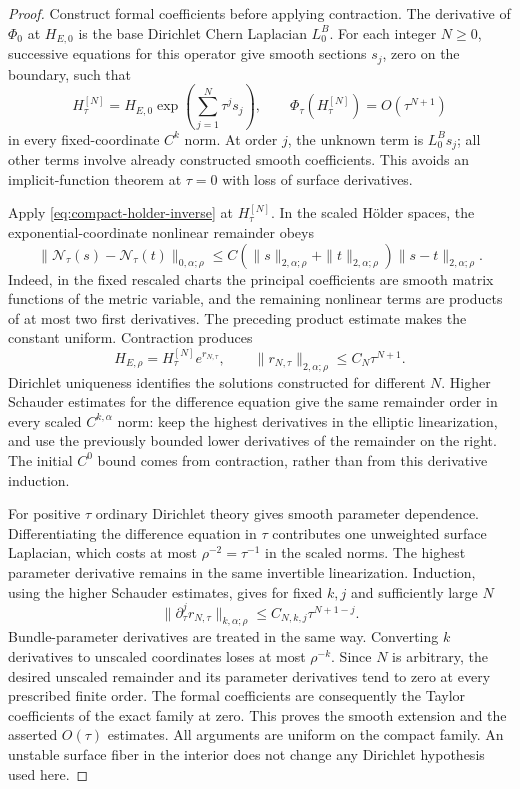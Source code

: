 \documentclass[11pt]{amsart}
\theoremstyle{definition}
\theoremstyle{remark}
\theoremstyle{plain}
\begin{document}
\begin{proof}
Construct formal coefficients before applying contraction. The derivative
of $\Phi_0$ at $H_{E,0}$ is the base Dirichlet Chern Laplacian $L_0^B$.
For each integer $N\geq0$, successive equations for this operator give
smooth sections $s_j$, zero on the boundary, such that
\[
 H_\tau^{[N]}=H_{E,0}\exp\left(\sum_{j=1}^N\tau^j s_j\right),
 \qquad
 \Phi_\tau(H_\tau^{[N]})=O(\tau^{N+1})
\]
in every fixed-coordinate $C^k$ norm. At order $j$, the unknown term is
$L_0^Bs_j$; all other terms involve already constructed smooth
coefficients. This avoids an implicit-function theorem at $\tau=0$
with loss of surface derivatives.

Apply \eqref{eq:compact-holder-inverse} at $H_\tau^{[N]}$. In the scaled
H\"older spaces, the exponential-coordinate nonlinear remainder obeys
\[
 \|\mathcal N_\tau(s)-\mathcal N_\tau(t)\|_{0,\alpha;\rho}
 \leq C(\|s\|_{2,\alpha;\rho}+\|t\|_{2,\alpha;\rho})
              \|s-t\|_{2,\alpha;\rho}.
\]
Indeed, in the fixed rescaled charts the principal coefficients are smooth
matrix functions of the metric variable, and the remaining nonlinear
terms are products of at most two first derivatives. The preceding
product estimate makes the constant uniform. Contraction produces
\[
 H_{E,\rho}=H_\tau^{[N]}e^{r_{N,\tau}},\qquad
 \|r_{N,\tau}\|_{2,\alpha;\rho}\leq C_N\tau^{N+1}.
\]
Dirichlet uniqueness identifies the solutions constructed for different
$N$. Higher Schauder estimates for the difference equation give the same
remainder order in every scaled $C^{k,\alpha}$ norm: keep the highest
derivatives in the elliptic linearization, and use the previously bounded
lower derivatives of the remainder on the right. The initial $C^0$ bound
comes from contraction, rather than from this derivative induction.

For positive $\tau$ ordinary Dirichlet theory gives smooth parameter
dependence. Differentiating the difference equation in $\tau$ contributes
one unweighted surface Laplacian, which costs at most $\rho^{-2}=\tau^{-1}$
in the scaled norms. The highest parameter derivative remains in the
same invertible linearization. Induction, using the higher Schauder
estimates, gives for fixed $k,j$ and sufficiently large $N$
\[
 \|\partial_\tau^j r_{N,\tau}\|_{k,\alpha;\rho}
 \leq C_{N,k,j}\tau^{N+1-j}.
\]
Bundle-parameter derivatives are treated in the same way. Converting
$k$ derivatives to unscaled coordinates loses at most $\rho^{-k}$.
Since $N$ is arbitrary, the desired unscaled remainder and its parameter
derivatives tend to zero at every prescribed finite order. The formal
coefficients are consequently the Taylor coefficients of the exact
family at zero. This proves the smooth extension and the asserted
$O(\tau)$ estimates. All arguments are uniform on the compact family.
An unstable surface fiber in the interior does not change any
Dirichlet hypothesis used here.
\end{proof}
\end{document}
